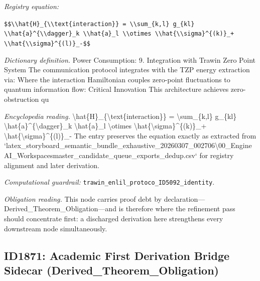 \documentclass[11pt]{article}
\theoremstyle{remark}
\begin{document}
\noindent\textit{Registry equation:}\par
{\small\texttt{\$\$\textbackslash{}\textbackslash{}hat\{H\}\_\{\textbackslash{}\textbackslash{}text\{interaction\}\} = \textbackslash{}\textbackslash{}sum\_\{k,l\} g\_\{kl\} \textbackslash{}\textbackslash{}hat\{a\}\textasciicircum{}\{\textbackslash{}\textbackslash{}dagger\}\_k \textbackslash{}\textbackslash{}hat\{a\}\_l \textbackslash{}\textbackslash{}otimes \textbackslash{}\textbackslash{}hat\{\textbackslash{}\textbackslash{}sigma\}\textasciicircum{}\{(k)\}\_+ \textbackslash{}\textbackslash{}hat\{\textbackslash{}\textbackslash{}sigma\}\textasciicircum{}\{(l)\}\_-\$\$}}\par\medskip
\noindent\textit{Dictionary definition.} Power Consumption: 9. Integration with Trawin Zero Point System The communication protocol integrates with the TZP energy extraction via: Where the interaction Hamiltonian couples zero-point fluctuations to quantum information flow: Critical Innovation This architecture achieves zero-obstruction qu\par\medskip
\noindent\textit{Encyclopedia reading.} \textbackslash{}hat\{H\}\_\{\textbackslash{}text\{interaction\}\} = \textbackslash{}sum\_\{k,l\} g\_\{kl\} \textbackslash{}hat\{a\}\textasciicircum{}\{\textbackslash{}dagger\}\_k \textbackslash{}hat\{a\}\_l \textbackslash{}otimes \textbackslash{}hat\{\textbackslash{}sigma\}\textasciicircum{}\{(k)\}\_+ \textbackslash{}hat\{\textbackslash{}sigma\}\textasciicircum{}\{(l)\}\_- The entry preserves the equation exactly as extracted from `latex\_storyboard\_semantic\_bundle\_exhaustive\_20260307\_002706\textbackslash{}00\_EngineAI\_Workspacesmaster\_candidate\_queue\_exports\_dedup.csv` for registry alignment and later derivation.
\par\medskip\noindent\textit{Computational guardrail:} \texttt{trawin\_enlil\_protoco\_ID5092\_identity}.
\par\medskip\noindent\textit{Obligation reading.} This node carries proof debt by declaration---Derived\_Theorem\_Obligation---and is therefore where the refinement pass should concentrate first: a discharged derivation here strengthens every downstream node simultaneously.

\subsection{ID1871: Academic First Derivation Bridge Sidecar (Derived\_Theorem\_Obligation)}
\end{document}

